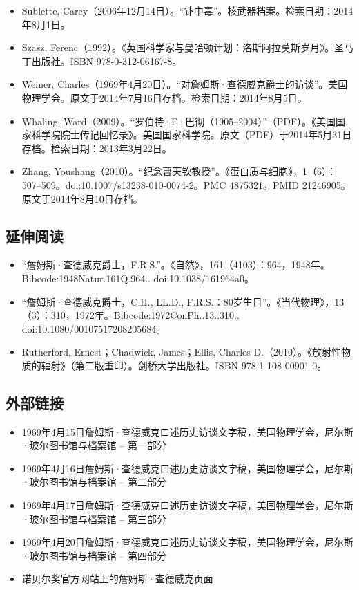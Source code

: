 \begin{itemize}
\item Sublette, Carey（2006年12月14日）。“钋中毒”。核武器档案。检索日期：2014年8月1日。
\item Szasz, Ferenc（1992）。《英国科学家与曼哈顿计划：洛斯阿拉莫斯岁月》。圣马丁出版社。ISBN 978-0-312-06167-8。
\item Weiner, Charles（1969年4月20日）。“对詹姆斯·查德威克爵士的访谈”。美国物理学会。原文于2014年7月16日存档。检索日期：2014年8月5日。
\item Whaling, Ward（2009）。“罗伯特·F·巴彻（1905–2004）”（PDF）。《美国国家科学院院士传记回忆录》。美国国家科学院。原文（PDF）于2014年5月31日存档。检索日期：2013年3月22日。
\item Zhang, Youshang（2010）。“纪念曹天钦教授”。《蛋白质与细胞》，1（6）：507–509。doi:10.1007/s13238-010-0074-2。PMC 4875321。PMID 21246905。原文于2014年8月10日存档。
\end{itemize}
\subsection{延伸阅读}
\begin{itemize}
\item “詹姆斯·查德威克爵士，F.R.S.”。《自然》，161（4103）：964，1948年。Bibcode:1948Natur.161Q.964.. doi:10.1038/161964a0。
\item “詹姆斯·查德威克爵士，C.H., LL.D., F.R.S.：80岁生日”。《当代物理》，13（3）：310，1972年。Bibcode:1972ConPh..13..310.. doi:10.1080/00107517208205684。
\item Rutherford, Ernest；Chadwick, James；Ellis, Charles D.（2010）。《放射性物质的辐射》（第二版重印）。剑桥大学出版社。ISBN 978-1-108-00901-0。
\end{itemize}
\subsection{外部链接}
\begin{itemize}
\item 1969年4月15日詹姆斯·查德威克口述历史访谈文字稿，美国物理学会，尼尔斯·玻尔图书馆与档案馆 – 第一部分
\item 1969年4月16日詹姆斯·查德威克口述历史访谈文字稿，美国物理学会，尼尔斯·玻尔图书馆与档案馆 – 第二部分
\item 1969年4月17日詹姆斯·查德威克口述历史访谈文字稿，美国物理学会，尼尔斯·玻尔图书馆与档案馆 – 第三部分
\item 1969年4月20日詹姆斯·查德威克口述历史访谈文字稿，美国物理学会，尼尔斯·玻尔图书馆与档案馆 – 第四部分
\item 诺贝尔奖官方网站上的詹姆斯·查德威克页面
\end{itemize}